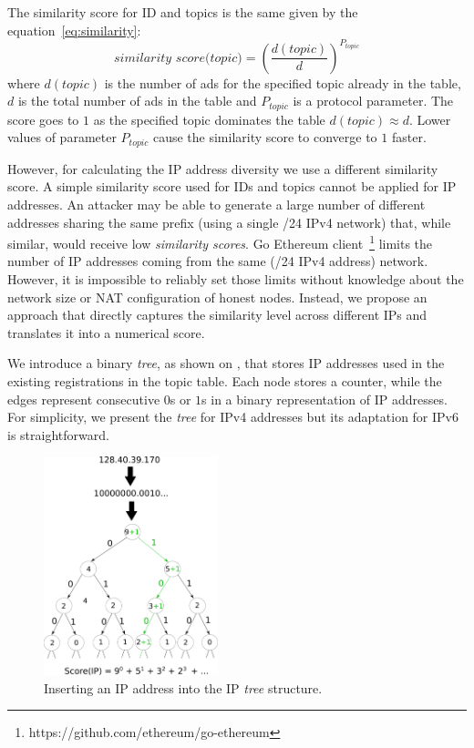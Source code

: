 The similarity score for ID and topics is the same given by the equation~\ref{eq:similarity}:
\begin{equation}
\label{eq:similarity}
    \textit{similarity score(topic)}= (\frac{d(topic)}{d})^{P_{topic}} 
\end{equation}
where $d(topic)$ is the number of ads for the specified topic already in the table, $d$ is the total number of ads in the table and $P_{topic}$ is a protocol parameter. 
The score goes to $1$ as the specified topic dominates the table $d(topic)  \approx  d$. 
Lower values of parameter $P_{topic}$ cause the similarity score to converge to $1$ faster. 

However,  for calculating the IP address diversity we use a different similarity score. 
A simple similarity score used for IDs and topics cannot be applied for IP addresses. 
An attacker may be able to generate a large number of different addresses sharing the same prefix (\eg using a single /24 IPv4 network) that, while similar, would receive low \emph{similarity scores}. 
Go Ethereum client~\footnote{https://github.com/ethereum/go-ethereum} limits the number of IP addresses coming from the same (\eg /24 IPv4 address) network. 
However,  it is impossible to reliably set those limits without knowledge about the network size or NAT configuration of honest nodes. 
Instead, we propose an approach that directly captures the similarity level across different IPs and translates it into a numerical score. 

We introduce a binary \emph{tree},  as shown on ,  that stores IP addresses used in the existing registrations in the topic table. 
Each node stores a counter,  while the edges represent consecutive $0$s or $1$s in a binary representation of IP addresses. 
For simplicity,  we present the \emph{tree} for IPv4 addresses but its adaptation for IPv6 is straightforward. 

\begin{figure}
    \includegraphics[width=0.45\textwidth]{img/ip_tree}
    \caption{Inserting an IP address into the IP \emph{tree} structure.}
    \label{fig:ip_tree}
\end{figure}

